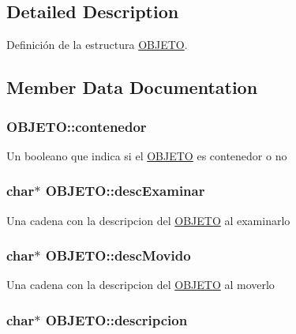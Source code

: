 \subsection{Detailed Description}
Definición de la estructura \hyperlink{structOBJETO}{OBJETO}. 

\subsection{Member Data Documentation}
\hypertarget{structOBJETO_ab850d0f6ff7d6cf1ab11958d7f442db0}{
\subsubsection[{contenedor}]{ {\bf OBJETO::contenedor}}}
\label{structOBJETO_ab850d0f6ff7d6cf1ab11958d7f442db0}
Un booleano que indica si el \hyperlink{structOBJETO}{OBJETO} es contenedor o no \hypertarget{structOBJETO_a99f06d3d28d653102f7deb8416d2b48e}{
\subsubsection[{descExaminar}]{\setlength{\rightskip}{0pt plus 5cm}char$\ast$ {\bf OBJETO::descExaminar}}}
\label{structOBJETO_a99f06d3d28d653102f7deb8416d2b48e}
Una cadena con la descripcion del \hyperlink{structOBJETO}{OBJETO} al examinarlo \hypertarget{structOBJETO_a1082c3ded3e9fec0eaa9c7558eafffd0}{
\subsubsection[{descMovido}]{\setlength{\rightskip}{0pt plus 5cm}char$\ast$ {\bf OBJETO::descMovido}}}
\label{structOBJETO_a1082c3ded3e9fec0eaa9c7558eafffd0}
Una cadena con la descripcion del \hyperlink{structOBJETO}{OBJETO} al moverlo \hypertarget{structOBJETO_afcd768e04fe1a5f48754705249abd2f3}{
\subsubsection[{descripcion}]{\setlength{\rightskip}{0pt plus 5cm}char$\ast$ {\bf OBJETO::descripcion}}}
